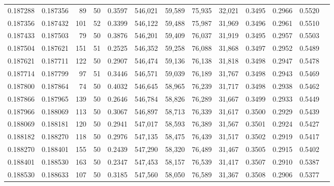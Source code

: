 \begin{tabular}{rrrrrrrrrrrrr}
0.187288 & 0.187356 &    89 &  50 &                                     0.3597 & 546,021 &  59,589 &  75,935 &  32,021 & 0.3495 & 0.2966 & 0.5520 \\
0.187356 & 0.187432 &   101 &  52 &                                     0.3399 & 546,122 &  59,488 &  75,987 &  31,969 & 0.3496 & 0.2961 & 0.5510 \\
0.187433 & 0.187503 &    79 &  50 &                                     0.3876 & 546,201 &  59,409 &  76,037 &  31,919 & 0.3495 & 0.2957 & 0.5503 \\
0.187504 & 0.187621 &   151 &  51 &                                     0.2525 & 546,352 &  59,258 &  76,088 &  31,868 & 0.3497 & 0.2952 & 0.5489 \\
0.187621 & 0.187711 &   122 &  50 &                                     0.2907 & 546,474 &  59,136 &  76,138 &  31,818 & 0.3498 & 0.2947 & 0.5478 \\
0.187714 & 0.187799 &    97 &  51 &                                     0.3446 & 546,571 &  59,039 &  76,189 &  31,767 & 0.3498 & 0.2943 & 0.5469 \\
0.187800 & 0.187864 &    74 &  50 &                                     0.4032 & 546,645 &  58,965 &  76,239 &  31,717 & 0.3498 & 0.2938 & 0.5462 \\
0.187866 & 0.187965 &   139 &  50 &                                     0.2646 & 546,784 &  58,826 &  76,289 &  31,667 & 0.3499 & 0.2933 & 0.5449 \\
0.187966 & 0.188069 &   113 &  50 &                                     0.3067 & 546,897 &  58,713 &  76,339 &  31,617 & 0.3500 & 0.2929 & 0.5439 \\
0.188069 & 0.188181 &   120 &  50 &                                     0.2941 & 547,017 &  58,593 &  76,389 &  31,567 & 0.3501 & 0.2924 & 0.5427 \\
0.188182 & 0.188270 &   118 &  50 &                                     0.2976 & 547,135 &  58,475 &  76,439 &  31,517 & 0.3502 & 0.2919 & 0.5417 \\
0.188270 & 0.188401 &   155 &  50 &                                     0.2439 & 547,290 &  58,320 &  76,489 &  31,467 & 0.3505 & 0.2915 & 0.5402 \\
0.188401 & 0.188530 &   163 &  50 &                                     0.2347 & 547,453 &  58,157 &  76,539 &  31,417 & 0.3507 & 0.2910 & 0.5387 \\
0.188530 & 0.188633 &   107 &  50 &                                     0.3185 & 547,560 &  58,050 &  76,589 &  31,367 & 0.3508 & 0.2906 & 0.5377 \\

\end{tabular}
